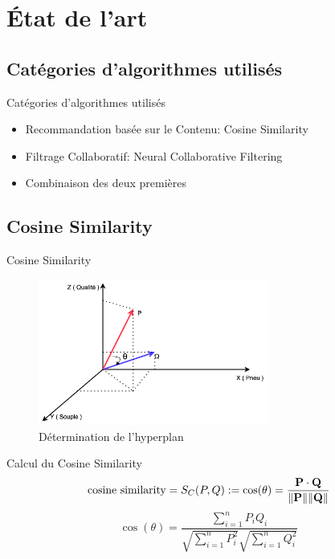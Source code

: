 \documentclass[xelatex,12pt]{beamer}
\begin{document}
\section{État de l'art}
\subsection{Catégories d'algorithmes utilisés}
\begin{frame}{Catégories d'algorithmes utilisés}
  \begin{itemize}
  \item Recommandation basée sur le Contenu: Cosine Similarity
  \item Filtrage Collaboratif: Neural Collaborative Filtering
  \item Combinaison des deux premières
  \end{itemize}
\end{frame}

\subsection{Cosine Similarity}
\begin{frame}{Cosine Similarity}
	\begin{figure}[H]
    \includegraphics[width=\linewidth, height=4.8cm]{images/cosin_similarity.png}
    \caption{Détermination de l’hyperplan}
    \label{fig:L1}
\end{figure}
\end{frame}
\begin{frame}{Calcul du Cosine Similarity}
$${\text{cosine similarity}}=S_{C}(P,Q):=\cos(\theta )={\mathbf {P} \cdot \mathbf {Q}  \over \|\mathbf {P} \|\|\mathbf {Q} \|} $$
$$\cos(\theta ) ={\frac {\sum \limits _{i=1}^{n}{P_{i}Q_{i}}}{{\sqrt {\sum \limits _{i=1}^{n}{P_{i}^{2}}}}{\sqrt {\sum \limits _{i=1}^{n}{Q_{i}^{2}}}}}}$$

\end{frame}

\end{document}
